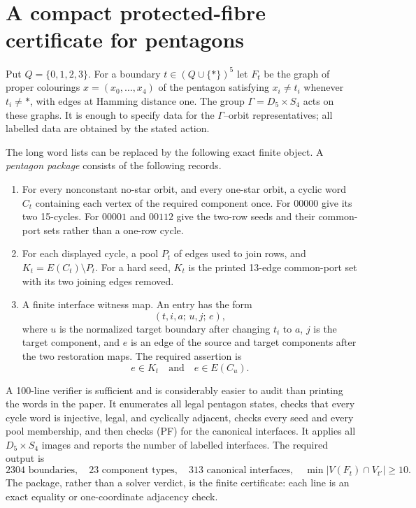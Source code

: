 \section*{A compact protected-fibre certificate for pentagons}

Put $Q=\{0,1,2,3\}$.  For a boundary
$t\in(Q\cup\{\ast\})^5$ let $F_t$ be the graph of proper colourings
$x=(x_0,\ldots,x_4)$ of the pentagon satisfying
$x_i\not=t_i$ whenever $t_i\ne\ast$, with edges at Hamming distance one.
The group $\Gamma=D_5\times S_4$ acts on these graphs.  It is enough to
specify data for the $\Gamma$--orbit representatives; all labelled data
are obtained by the stated action.

The long word lists can be replaced by the following exact finite object.
A \emph{pentagon package} consists of the following records.
\begin{enumerate}
\item For every nonconstant no-star orbit, and every one-star orbit, a
  cyclic word $C_t$ containing each vertex of the required component once.
  For $00000$ give its two 15-cycles.  For $00001$ and $00112$ give the
  two-row seeds and their common-port sets rather than a one-row cycle.
\item For each displayed cycle, a pool $P_t$ of edges used to join rows,
  and $K_t=E(C_t)\setminus P_t$.  For a hard seed, $K_t$ is the printed
  13-edge common-port set with its two joining edges removed.
\item A finite interface witness map.  An entry has the form
  \[
  (t,i,a;\,u,j;\,e),
  \]
  where $u$ is the normalized target boundary after changing $t_i$ to
  $a$, $j$ is the target component, and $e$ is an edge of the source and
  target components after the two restoration maps.  The required
  assertion is
  \[
  e\in K_t\quad\text{and}\quad e\in E(C_u).\tag{PF}
  \]
\end{enumerate}

A 100-line verifier is sufficient and is considerably easier to audit than
printing the words in the paper.  It enumerates all legal pentagon states,
checks that every cycle word is injective, legal, and cyclically adjacent,
checks every seed and every pool membership, and then checks (PF) for the
canonical interfaces.  It applies all $D_5\times S_4$ images and reports the
number of labelled interfaces.  The required output is
\[
  2304\text{ boundaries},\quad 23\text{ component types},\quad
  313\text{ canonical interfaces},\quad
  \min |V(F_t)\cap V_{t'}|\ge 10.
\]
The package, rather than a solver verdict, is the finite certificate: each
line is an exact equality or one-coordinate adjacency check.

